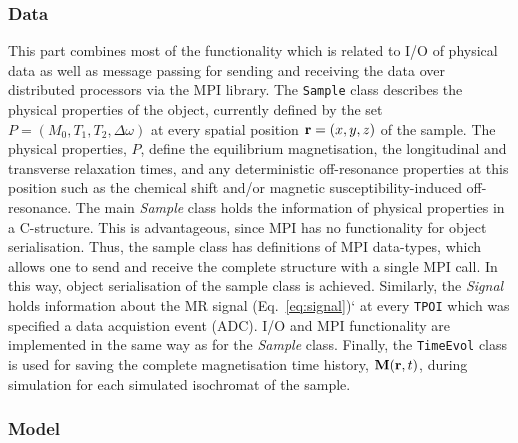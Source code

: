 \documentclass[journal,onecolumn,12pt]{IEEEtran}
\begin{document}

\subsubsection{Data}

This part combines most of the functionality which is related to I/O of physical data as well as message passing for
sending and receiving the data over distributed processors via the MPI library. The \verb+Sample+ class describes the
physical properties of the object, currently defined by the set $P=(M_0,T_1,T_2,\Delta\omega)$ at every spatial position
${\bf r}=(x,y,z)$ of the sample. The physical properties, $P$, define the equilibrium magnetisation, the longitudinal
and transverse relaxation times, and any deterministic off-resonance properties at this position such as the chemical
shift and/or magnetic susceptibility-induced off-resonance. The main {\it Sample} class holds the information of
physical properties in a C-structure. This is advantageous, since MPI has no functionality for object
serialisation. Thus, the sample class has definitions of MPI data-types, which allows one to send and receive the
complete structure with a single MPI call. In this way, object serialisation of the sample class is achieved. Similarly,
the {\it Signal} holds information about the MR signal (Eq.~\ref{eq:signal})` at every \verb+TPOI+ which was specified a
data acquistion event (ADC). I/O and MPI functionality are implemented in the same way as for the {\it Sample}
class. Finally, the \verb+TimeEvol+ class is used for saving the complete magnetisation time history, ${\bf M}({\bf
 r},t)$, during simulation for each simulated isochromat of the sample.\\



\subsubsection{Model}
\end{document}
